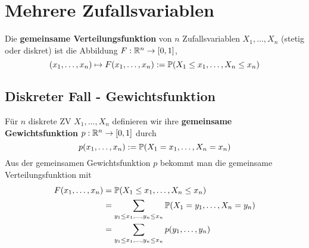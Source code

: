 \section{Mehrere Zufallsvariablen}
\begin{mainbox}{}
    Die \textbf{gemeinsame Verteilungsfunktion} von $n$ Zufallsvariablen $X_1, \ldots, X_n$ (stetig oder diskret) ist die Abbildung $F: \R^n \to [0,1]$,
    $$(x_1, \ldots, x_n) \mapsto F(x_1, \ldots, x_n) := \P(X_1 \leq x_1, \ldots, X_n \leq x_n)$$
\end{mainbox}
\subsection{Diskreter Fall - Gewichtsfunktion}
    Für $n$ diskrete ZV $X_1, \ldots, X_n$ definieren wir ihre \textbf{gemeinsame Gewichtsfunktion} $p: \R^n \to [0,1]$ durch
    $$p(x_1, \ldots, x_n) := \P(X_1 = x_1, \ldots, X_n = x_n)$$
    Aus der gemeinsamen Gewichtsfunktion $p$ bekommt man die gemeinsame Verteilungsfunktion mit
    \begin{align*}
        F(x_1, \ldots, x_n) &= \P(X_1 \leq x_1, \ldots, X_n \leq x_n)\\
        &= \sum_{y_1 \leq x_1, \ldots, y_n \leq x_n}\P(X_1 = y_1, \ldots, X_n = y_n)\\
        &= \sum_{y_1 \leq x_1, \ldots, y_n \leq x_n}p(y_1, \ldots,y_n)
    \end{align*}    

